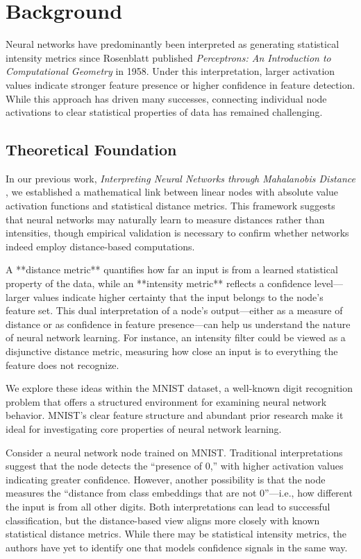 \section{Background}

Neural networks have predominantly been interpreted as generating statistical intensity metrics since Rosenblatt published \textit{Perceptrons: An Introduction to Computational Geometry} in 1958. Under this interpretation, larger activation values indicate stronger feature presence or higher confidence in feature detection. While this approach has driven many successes, connecting individual node activations to clear statistical properties of data has remained challenging.

\subsection{Theoretical Foundation}

In our previous work, \textit{Interpreting Neural Networks through Mahalanobis Distance} \citep{oursland2024interpreting}, we established a mathematical link between linear nodes with absolute value activation functions and statistical distance metrics. This framework suggests that neural networks may naturally learn to measure distances rather than intensities, though empirical validation is necessary to confirm whether networks indeed employ distance-based computations.

A **distance metric** quantifies how far an input is from a learned statistical property of the data, while an **intensity metric** reflects a confidence level—larger values indicate higher certainty that the input belongs to the node's feature set. This dual interpretation of a node’s output—either as a measure of distance or as confidence in feature presence—can help us understand the nature of neural network learning. For instance, an intensity filter could be viewed as a disjunctive distance metric, measuring how close an input is to everything the feature does not recognize.

We explore these ideas within the MNIST dataset, a well-known digit recognition problem that offers a structured environment for examining neural network behavior. MNIST's clear feature structure and abundant prior research make it ideal for investigating core properties of neural network learning.

Consider a neural network node trained on MNIST. Traditional interpretations suggest that the node detects the “presence of 0,” with higher activation values indicating greater confidence. However, another possibility is that the node measures the “distance from class embeddings that are not 0”—i.e., how different the input is from all other digits. Both interpretations can lead to successful classification, but the distance-based view aligns more closely with known statistical distance metrics. While there may be statistical intensity metrics, the authors have yet to identify one that models confidence signals in the same way.

